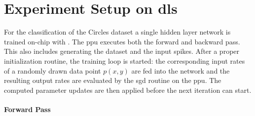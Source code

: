 \section{Experiment Setup on \gls{dls}}
\label{circlesimplementation}
For the classification of the Circles dataset a single hidden layer network is trained on-chip with . The \gls{ppu} executes both the forward and backward pass. This also includes generating the dataset and the input spikes. After a proper initialization routine, the training loop is started: the corresponding input rates of a randomly drawn data point $p(x,y)$ are fed into the network and the resulting output rates are evaluated by the \gls{sgd} routine on the \gls{ppu}. The computed parameter updates are then applied before the next iteration can start.

\paragraph{Forward Pass}

